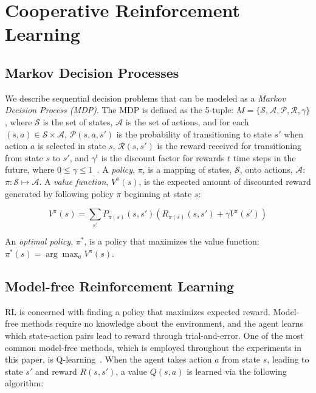 \documentclass[letterpaper]{article}
\begin{document}
\section{Cooperative Reinforcement Learning}

\subsection{Markov Decision Processes}

We describe sequential decision problems that can be modeled as a \textit{Markov Decision Process (MDP)}. The MDP is defined as the 5-tuple: $M=\{\mathcal{S},\mathcal{A},\mathcal{P},\mathcal{R},\gamma\}$, where $\mathcal{S}$ is the set of states, $\mathcal{A}$ is the set of actions, and for each $(s,a) \in \mathcal{S} \times \mathcal{A}$, $\mathcal{P}(s,a,s')$ is the probability of transitioning to state $s'$ when action $a$ is selected in state $s$, $\mathcal{R}(s,s')$ is the reward received for transitioning from state $s$ to $s'$, and $\gamma^t$ is the discount factor for rewards $t$ time steps in the future, where $0\leq\gamma\leq1$~\cite{sutton1998reinforcement}. A \textit{policy}, $\pi$, is a mapping of states, $\mathcal{S}$, onto actions, $\mathcal{A}$: $\pi:\mathcal{S}\mapsto\mathcal{A}$. A \textit{value function}, $V^{\pi}(s)$, is the expected amount of discounted reward generated by following policy $\pi$ beginning at state $s$:

\begin{equation} 
V^{\pi}(s) = \sum\limits_{s'} P_{\pi(s)}(s,s')(R_{\pi(s)}(s,s')+\gamma V^{\pi}(s'))
\end{equation}

\noindent
An \textit{optimal policy}, $\pi^{*}$, is a policy that maximizes the value function: $\pi^{*}(s) = \arg\max_a V^{\pi}(s)$.

\subsection{Model-free Reinforcement Learning}

RL is concerned with finding a policy that maximizes expected reward. Model-free methods require no knowledge about the environment, and the agent learns which state-action pairs lead to reward through trial-and-error. One of the most common model-free methods, which is employed throughout the experiments in this paper, is Q-learning~\cite{sutton1998reinforcement}. When the agent takes action $a$ from state $s$, leading to state $s'$ and reward $R(s,s')$, a value $Q(s,a)$ is learned via the following algorithm:
\end{document}
